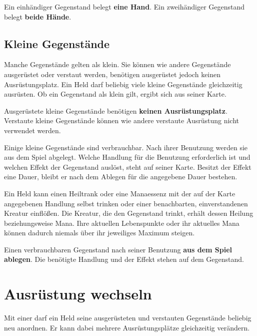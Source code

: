 \begin{kurzregel}[title=Ein- und zweihändige Gegenstände]
Ein einhändiger Gegenstand belegt \textbf{eine Hand}. Ein zweihändiger Gegenstand belegt \textbf{beide Hände}.
\end{kurzregel}

\subsection{Kleine Gegenstände}

Manche Gegenstände gelten als klein. Sie können wie andere Gegenstände ausgerüstet oder verstaut werden, benötigen ausgerüstet jedoch keinen Ausrüstungsplatz. Ein Held darf beliebig viele kleine Gegenstände gleichzeitig ausrüsten. Ob ein Gegenstand als klein gilt, ergibt sich aus seiner Karte.

\begin{kurzregel}[title=Kleine Gegenstände]
Ausgerüstete kleine Gegenstände benötigen \textbf{keinen Ausrüstungsplatz}. Verstaute kleine Gegenstände können wie andere verstaute Ausrüstung nicht verwendet werden.
\end{kurzregel}

Einige kleine Gegenstände sind verbrauchbar. Nach ihrer Benutzung werden sie aus dem Spiel abgelegt. Welche Handlung für die Benutzung erforderlich ist und welchen Effekt der Gegenstand auslöst, steht auf seiner Karte. Besitzt der Effekt eine Dauer, bleibt er nach dem Ablegen für die angegebene Dauer bestehen.

Ein Held kann einen Heiltrank oder eine Manaessenz mit der auf der Karte angegebenen Handlung selbst trinken oder einer benachbarten, einverstandenen Kreatur einflößen. Die Kreatur, die den Gegenstand trinkt, erhält dessen Heilung beziehungsweise Mana. Ihre aktuellen Lebenspunkte oder ihr aktuelles Mana können dadurch niemals über ihr jeweiliges Maximum steigen.

\begin{kurzregel}[title=Verbrauchsgegenstände]
Einen verbrauchbaren Gegenstand nach seiner Benutzung \textbf{aus dem Spiel ablegen}. Die benötigte Handlung und der Effekt stehen auf dem Gegenstand.
\end{kurzregel}

\section{Ausrüstung wechseln}

Mit einer \moveAction{} darf ein Held seine ausgerüsteten und verstauten Gegenstände beliebig neu anordnen. Er kann dabei mehrere Ausrüstungsplätze gleichzeitig verändern.

